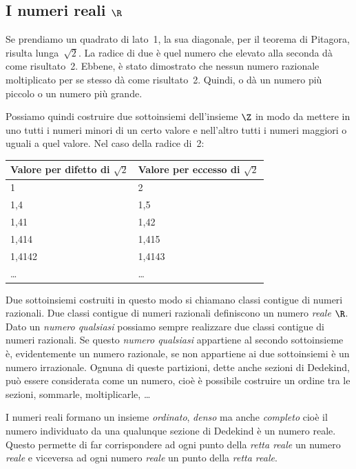 \subsection{I numeri reali $\R$}
\label{subsec:insnum_reali}

Se prendiamo un quadrato di lato~1, la sua diagonale, per il teorema di 
Pitagora, risulta lunga~$\sqrt{2}$. 
La radice di due è quel numero che elevato alla seconda dà come risultato~2.
Ebbene, è stato dimostrato che nessun numero razionale moltiplicato per se 
stesso dà come risultato~2. Quindi, o dà un numero più piccolo o un numero 
più 
grande.

Possiamo quindi costruire due sottoinsiemi dell'insieme $\Z$ in modo da 
mettere 
in uno tutti i numeri minori di un certo valore e nell'altro tutti i numeri 
maggiori o uguali a quel valore. Nel caso della radice di~2:

\begin{center}
 \begin{tabular}{ll}
\toprule
Valore per difetto di $\sqrt{2}$ &Valore per eccesso di $\sqrt{2}$ \\
\midrule
1& 2\\
1,4& 1,5 \\
1,41& 1,42\\
1,414& 1,415\\
1,4142& 1,4143\\
\ldots& \ldots\\
\bottomrule
\end{tabular}
\end{center}

Due sottoinsiemi costruiti in questo modo si chiamano classi contigue di 
numeri razionali. Due classi contigue di numeri razionali definiscono un 
numero 
\emph{reale} $\R$. Dato un \emph{numero qualsiasi} possiamo sempre realizzare 
due classi contigue di numeri razionali. Se questo \emph{numero qualsiasi} 
appartiene al secondo sottoinsieme è, evidentemente un numero razionale, se 
non 
appartiene ai due sottoinsiemi è un numero irrazionale. Ognuna di queste 
partizioni, dette anche sezioni di Dedekind, può essere considerata come un
numero, cioè è possibile costruire un ordine tra le sezioni, sommarle, 
moltiplicarle, \dots

I numeri reali formano un insieme \emph{ordinato}, \emph{denso} ma anche 
\emph{completo} cioè il numero individuato da una qualunque sezione di 
Dedekind è un numero reale.
Questo permette di far corrispondere ad ogni punto della \emph{retta reale} 
un numero \emph{reale} e viceversa ad ogni numero \emph{reale} un punto 
della \emph{retta reale}. 

